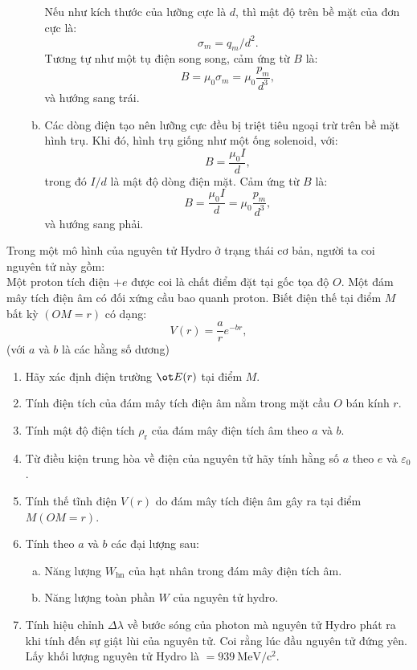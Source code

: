 \begin{loigiai}
\begin{enumerate}[1)]
\begin{enumerate}[a)]
    Nếu như kích thước của lưỡng cực là $d$, thì mật độ trên bề mặt của đơn cực là:
    $$\sigma_m=q_m/d^2.$$
    Tương tự như một tụ điện song song, cảm ứng từ $B$ là:
    $$B=\mu_0\sigma_m=\mu_0\dfrac{p_m}{d^3},$$
    và hướng sang trái.
        \item Các dòng điện tạo nên lưỡng cực đều bị triệt tiêu ngoại trừ trên bề mặt hình trụ. Khi đó, hình trụ giống như một ống solenoid, với:
        $$B=\dfrac{\mu_0 I}{d},$$
        trong đó $I/d$ là mật độ dòng điện mặt. Cảm ứng từ $B$ là:
        $$B=\dfrac{\mu_0 I}{d}=\mu_0\dfrac{p_m}{d^3},$$
        và hướng sang phải.
    \end{enumerate}
\end{enumerate}
\end{loigiai} 


\begin{vd} %
Trong một mô hình của nguyên tử Hydro ở trạng thái cơ bản, người ta coi nguyên tử này gồm:\\
Một proton tích điện $+e$ được coi là chất điểm đặt tại gốc tọa độ $O$. Một đám mây tích điện âm có đối xứng cầu bao quanh proton. Biết điện thế tại điểm $M$ bất kỳ $(OM = r)$ có dạng:
\[V(r)=\dfrac{a}{r} e^{-b r},\]
		(với $a$ và $b$ là các hằng số dương)
\begin{enumerate}[1)]
    \item  Hãy xác định điện trường $\ot E({r})$ tại điểm $M$.
     \item Tính điện tích của đám mây tích điện âm nằm trong mặt cầu $O$ bán kính $r$.
  \item Tính mật độ điện tích $\rho_{\mathrm{r}}$ của đám mây điện tích âm theo $a$ và $b$.	
     \item Từ điều kiện trung hòa về điện của nguyên tử hãy tính hằng số $a$ theo $e$ và $\varepsilon_{0}$.
  \item Tính thế tĩnh điện $V(r)$ do đám mây tích điện âm gây ra tại điểm $M (OM=r)$.
  \item Tính theo $a$ và $b$ các đại lượng sau:
  \begin{enumerate}[a)]
      \item  Năng lượng $W_\mathrm{hn}$ của hạt nhân trong đám mây điện tích âm.
     \item Năng lượng toàn phần $W$ của nguyên tử hydro.
  \end{enumerate}
  
  \item Tính hiệu chỉnh $\Delta \lambda$ về bước sóng của photon mà nguyên tử Hydro phát ra khi tính đến sự giật lùi của nguyên tử. Coi rằng lúc đầu nguyên tử đứng yên. Lấy khối lượng nguyên tử Hydro là $ = 939 ~\mathrm{MeV/c^2}$.
\end{enumerate}
   \end{vd}

